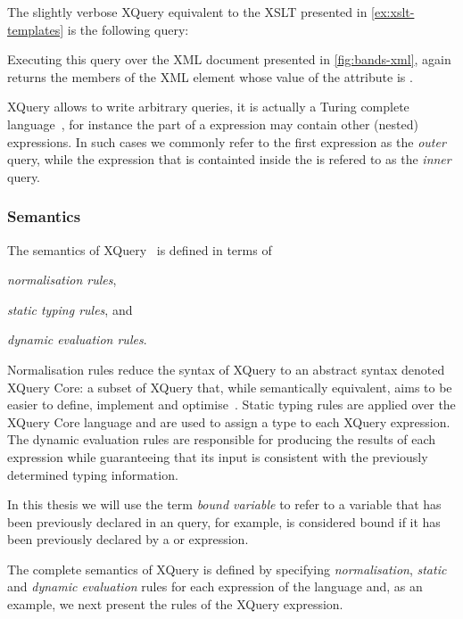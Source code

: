 \begin{example}
  \label{ex:xquery-query}
  The slightly verbose XQuery equivalent to the XSLT presented in \cref{ex:xslt-templates} is the following
  query:
  
  Executing this query over the \ac{XML} document presented in \cref{fig:bands-xml}, again returns the members of the
   \ac{XML} element whose value of the  attribute is .
\end{example}
%
XQuery allows to write arbitrary queries, it is actually a Turing complete language~\cite{Kepser:2004aa}, for instance
the \RETURN part of a \FLWOR expression may contain other (nested) \FLWOR expressions.  
%
In such cases we commonly refer to the first \FLWOR expression as the \emph{outer} query, while the \FLWOR expression
that is containted inside the \RETURN is refered to as the \emph{inner} query.


\subsubsection*{Semantics}
%
The semantics of XQuery~\cite{DraperFankhauserFernandez:2010aa} is defined in terms of
%
\begin{inparaenum}[(i)]
\item \emph{normalisation rules},
\item \emph{static typing rules}, and
\item \emph{dynamic evaluation rules}.
\end{inparaenum}
%
Normalisation rules reduce the syntax of XQuery to an abstract syntax denoted XQuery Core: a subset of XQuery that,
while semantically equivalent, aims to be easier to define, implement and optimise~\cite{KatzChamberlinKay:2003aa}.
%
Static typing rules are applied over the XQuery Core language and are used to assign a type to each XQuery expression.
The dynamic evaluation rules are responsible for producing the results of each expression while guaranteeing that its
input is consistent with the previously determined typing information.

In this thesis we will use the term \emph{bound variable} to refer to a variable that has been previously declared in an
query, for example,  is considered bound if it has been previously declared by a  or
 expression.


The complete semantics of XQuery is defined by specifying \emph{normalisation}, \emph{static} and \emph{dynamic
  evaluation} rules for each expression of the language and, as an example, we next present the rules of the XQuery \FOR
expression.

